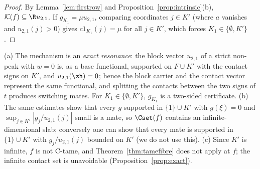 \begin{proof}
By Lemma~\ref{lem:firstrow} and Proposition~\ref{prop:intrinsic}(b),
$\mathcal K(f)\subseteq\R u_{2,1}$.  If $g_{K_1}=\mu u_{2,1}$, comparing
coordinates $j\in K'$ (where $a$ vanishes and $u_{2,1}(j)>0$) gives
$c1_{K_1}(j)=\mu$ for all $j\in K'$, which forces $K_1\in\{\emptyset,K'\}$.
\end{proof}

\begin{remark}\label{rem:twopiece}
(a) The mechanism is an \emph{exact resonance}: the block vector $u_{2,1}$
of a strict non-peak with $w=0$ is, as a base functional, supported on
$F\cup K'$ with the contact signs on $K'$, and $u_{2,1}(\zh)=0$; hence the
block carrier and the contact vector represent the same functional, and
splitting the contacts between the two signs of $t$ produces switching
mates.  For $K_1\in\{\emptyset,K'\}$, $g_{K_1}$ is a two-sided certificate.
(b) The same estimates show that every $g$ supported in $\{1\}\cup K'$ with
$g(\xi)=0$ and $\sup_{j\in K'}|g_j/u_{2,1}(j)|$ small is a mate, so
$\Cset(f)$ contains an infinite-dimensional slab; conversely one can show
that every mate is supported in $\{1\}\cup K'$ with $g_j/u_{2,1}(j)$
bounded on $K'$ (we do not use this).  (c) Since $K'$ is infinite, $f$ is
not C-tame, and Theorem~\ref{thm:tamefibre} does not apply at $f$; the
infinite contact set is unavoidable (Proposition~\ref{prop:exact}).
\end{remark}

